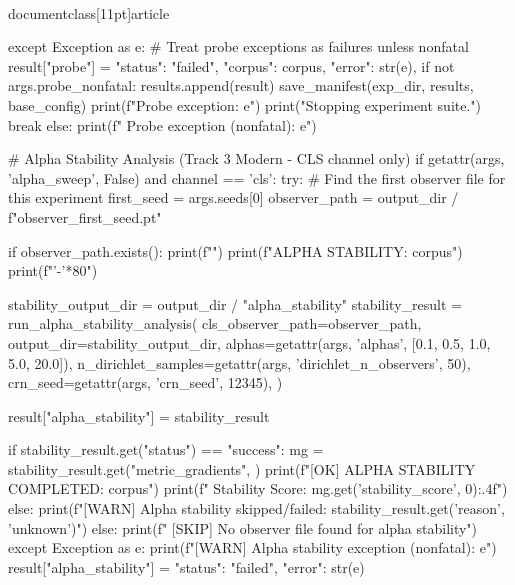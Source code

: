 \\documentclass[11pt]{article}
\begin{document}
\begin{CodeBlock}
                    except Exception as e:
                        # Treat probe exceptions as failures unless nonfatal
                        result["probe"] = {
                            "status": "failed",
                            "corpus": corpus,
                            "error": str(e),
                        }
                        if not args.probe_nonfatal:
                            results.append(result)
                            save_manifest(exp_dir, results, base_config)
                            print(f"\n Probe exception: {e}")
                            print("Stopping experiment suite.")
                            break
                        else:
                            print(f" Probe exception (nonfatal): {e}")
        
                # Alpha Stability Analysis (Track 3 Modern - CLS channel only)
                if getattr(args, 'alpha_sweep', False) and channel == 'cls':
                    try:
                        # Find the first observer file for this experiment
                        first_seed = args.seeds[0]
                        observer_path = output_dir / f"observer_{first_seed}.pt"

                        if observer_path.exists():
                            print(f"")
                            print(f"ALPHA STABILITY: {corpus}")
                            print(f"{'-'*80}")

                            stability_output_dir = output_dir / "alpha_stability"
                            stability_result = run_alpha_stability_analysis(
                                cls_observer_path=observer_path,
                                output_dir=stability_output_dir,
                                alphas=getattr(args, 'alphas', [0.1, 0.5, 1.0, 5.0, 20.0]),
                                n_dirichlet_samples=getattr(args, 'dirichlet_n_observers', 50),
                                crn_seed=getattr(args, 'crn_seed', 12345),
                            )

                            result["alpha_stability"] = stability_result

                            if stability_result.get("status") == "success":
                                mg = stability_result.get("metric_gradients", {})
                                print(f"[OK] ALPHA STABILITY COMPLETED: {corpus}")
                                print(f"  Stability Score: {mg.get('stability_score', 0):.4f}")
                            else:
                                print(f"[WARN] Alpha stability skipped/failed: {stability_result.get('reason', 'unknown')}")
                        else:
                            print(f"  [SKIP] No observer file found for alpha stability")
                    except Exception as e:
                        print(f"[WARN] Alpha stability exception (nonfatal): {e}")
                        result["alpha_stability"] = {"status": "failed", "error": str(e)}


\end{CodeBlock}
\end{document}
